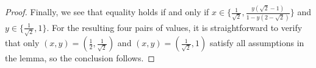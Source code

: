 \documentclass[10pt,a4paper]{amsart}
\begin{document}
\begin{proof}
Finally, we see that equality holds if and only if $x \in \{ \frac{1}{\sqrt{2}}, \frac{y(\sqrt{2}-1)}{1-y(2-\sqrt{2})} \}$ and $y \in \{ \frac{1}{\sqrt{2}}, 1 \}$. For the resulting four pairs of values, it is straightforward to verify that only $(x,y) = ( \frac{1}{2}, \frac{1}{\sqrt{2}} )$ and $(x,y) = ( \frac{1}{\sqrt{2}},1 )$ satisfy all assumptions in the lemma, so the conclusion follows.
\end{proof}
\end{document}
